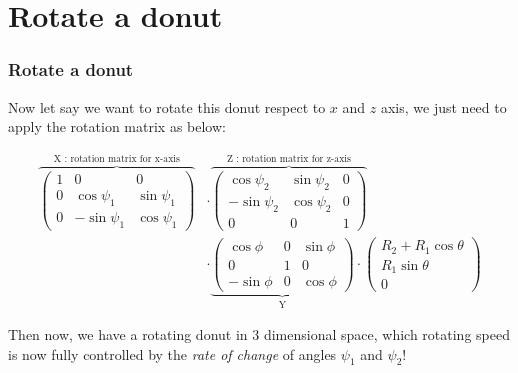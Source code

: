 \documentclass[12pt, t]{beamer}
\renewcommand{\emph}[1]{{\color{Turquoise3}\textsl{#1}}}
\begin{document}

\section{Rotate a donut}
\begin{frame}
    \frametitle{Rotate a donut}

    Now let say we want to rotate this donut respect to $x$ and $z$ axis, we just need to apply the
    rotation matrix as below:

    \begin{equation*}
        \begin{split}
            \overbrace{
                \begin{pmatrix}
                    1           & 0             & 0             \\
                    0           & \cos\psi_1    & \sin\psi_1    \\
                    0           & -\sin\psi_1   & \cos\psi_1
                \end{pmatrix}
            }^\text{X : rotation matrix for x-axis}
            &\cdot
            \overbrace{
                \begin{pmatrix}
                    \cos\psi_2  & \sin \psi_2   & 0         \\
                    -\sin\psi_2 & \cos \psi_2   & 0         \\
                    0           & 0             & 1
                \end{pmatrix}
            }^\text{Z : rotation matrix for z-axis}\\
            &\cdot
            \underbrace{
            \begin{pmatrix}
                \cos\phi & 0 & \sin\phi \\
                0 & 1 & 0\\
                -\sin\phi & 0 & \cos\phi
            \end{pmatrix}
            }_\text{Y}
            \cdot
            \begin{pmatrix}
                R_2 + R_1\cos{\theta} \\
                R_1\sin{\theta} \\
                0
            \end{pmatrix}
        \end{split}
    \end{equation*}

    Then now, we have a rotating donut in 3 dimensional space, which rotating speed is now fully 
    controlled by the \emph{rate of change} of angles $\psi_1$ and $\psi_2$!

\end{frame}
\end{document}
